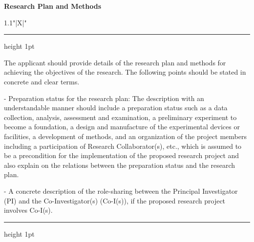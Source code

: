 \documentclass[8pt]{extarticle}
\makeatletter
\newcommand{\thickhline}{%
	\noalign {\ifnum 0=`}\fi \hrule height 1pt
	\futurelet \reserved@a \@xhline
}
\makeatother
\begin{document}
	
\noindent\textbf{\fontsize{12}{12}\selectfont Research Plan and Methods}\\
\begin{tabularx}{1.1\linewidth}{"|X|"}
	\thickhline
	The applicant should provide details of the research plan and methods for achieving the objectives of the research. The following points should be stated in concrete and clear terms.
	
	- Preparation status for the research plan: The description with an understandable manner should include a preparation status such as a data collection, analysis, assessment and examination, a preliminary experiment to become a foundation, a design and manufacture of the experimental devices or facilities, a development of methods, and an organization of the project members including a participation of Research Collaborator(s), etc., which is assumed to be a precondition for the implementation of the proposed research project and also explain on the relations between the preparation status and the research plan.
	
	- A concrete description of the role-sharing between the Principal Investigator (PI) and the Co-Investigator(s) (Co-I(s)), if the proposed research project involves Co-I(s).
	\\
	\thickhline
\end{tabularx}
\end{document}
